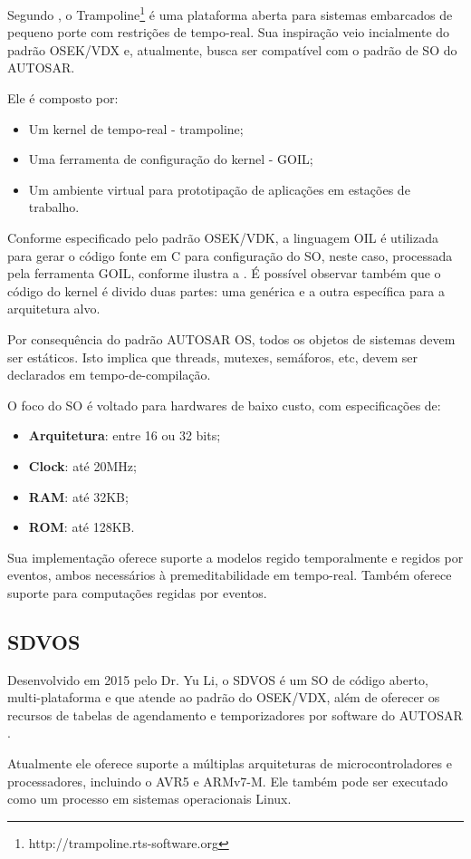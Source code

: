 Segundo , o Trampoline\footnote{http://trampoline.rts-software.org} é uma plataforma aberta para sistemas embarcados de pequeno porte com restrições de tempo-real. Sua inspiração veio incialmente do padrão OSEK/VDX e, atualmente, busca ser compatível com o padrão de SO do AUTOSAR.

Ele é composto por:
\begin{itemize}
	\item Um kernel de tempo-real - trampoline;
	\item Uma ferramenta de configuração do kernel - GOIL;
	\item Um ambiente virtual para prototipação de aplicações em estações de trabalho.
\end{itemize}

Conforme especificado pelo padrão OSEK/VDK, a linguagem OIL é utilizada para gerar o código fonte em C para configuração do SO, neste caso, processada pela ferramenta GOIL, conforme ilustra a . É possível observar também que o código do kernel é divido duas partes: uma genérica e a outra específica para a arquitetura alvo.


Por consequência do padrão AUTOSAR OS, todos os objetos de sistemas devem ser estáticos. Isto implica que threads, mutexes, semáforos, etc, devem ser declarados em tempo-de-compilação.

O foco do SO é voltado para hardwares de baixo custo, com especificações de:
\begin{itemize}
	\item \textbf{Arquitetura}: entre 16 ou 32 bits;
	\item \textbf{Clock}: até 20MHz;
	\item \textbf{RAM}: até 32KB;
	\item \textbf{ROM}:	até 128KB.
\end{itemize}

Sua implementação oferece suporte a modelos regido temporalmente e regidos por eventos, ambos necessários à premeditabilidade em tempo-real. Também oferece suporte para computações regidas por eventos.

\subsection{SDVOS}

Desenvolvido em 2015 pelo Dr. Yu Li, o SDVOS é um SO de código aberto, multi-plataforma e que atende ao padrão do OSEK/VDX, além de oferecer os recursos de tabelas de agendamento e temporizadores por software do AUTOSAR \cite{sdvos}.

Atualmente ele oferece suporte a múltiplas arquiteturas de microcontroladores e processadores, incluindo o AVR5 e ARMv7-M. Ele também pode ser executado como um processo em sistemas operacionais Linux.